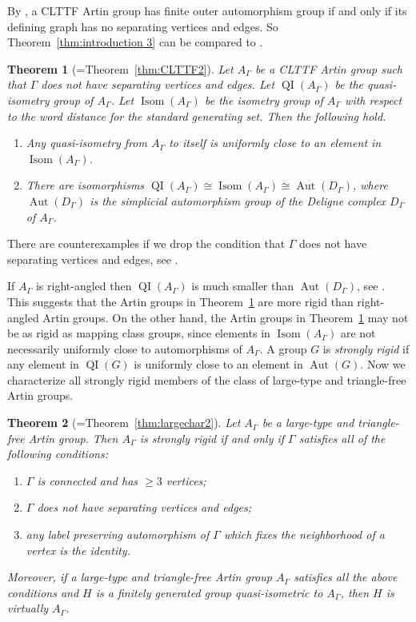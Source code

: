 \documentclass[11pt]{amsart}
\newcommand{\QI}{\operatorname{QI}}
\newcommand{\Isom}{\operatorname{Isom}}
\newcommand{\Aut}{\operatorname{Aut}}
\newtheorem{theorem}{Theorem}[section]
\theoremstyle{definition}
\begin{document}
By \cite[Theorem 1]{MR2174269}, a CLTTF Artin group has finite outer automorphism group if and only if its defining graph has no separating vertices and edges. So Theorem~\ref{thm:introduction 3} can be compared to \cite[Theorem 1.1]{MR3692971}.

\begin{theorem}[=Theorem~\ref{thm:CLTTF2}]
	\label{thm:intro4}
	Let $A_\Gamma$ be a CLTTF Artin group such that $\Gamma$ does not have separating vertices and edges. Let $\QI(A_\Gamma)$ be the quasi-isometry group of $A_\Gamma$. Let $\Isom(A_\Gamma)$ be the isometry group of $A_\Gamma$ with respect to the word distance for the standard generating set. Then the following hold.
	\begin{enumerate}
		\item Any quasi-isometry from $A_\Gamma$ to itself is uniformly close to an element in $\Isom(A_\Gamma)$.
		\item There are isomorphisms $\QI(A_\Gamma)\cong \Isom(A_\Gamma)\cong \Aut(D_\Gamma)$, where $\Aut(D_\Gamma)$ is the simplicial automorphism group of the Deligne complex $D_\Gamma$ of $A_\Gamma$.
	\end{enumerate}
\end{theorem}

There are counterexamples if we drop the condition that $\Gamma$ does not have separating vertices and edges, see \cite[Lemma 42]{MR2174269}.

If $A_\Gamma$ is right-angled then $\QI(A_\Gamma)$ is much smaller than $\Aut(D_\Gamma)$, see \cite[Corollary 4.20]{MR3692971}. This suggests that the Artin groups in Theorem~\ref{thm:intro4} are more rigid than right-angled Artin groups. On the other hand, the Artin groups in Theorem~\ref{thm:intro4} may not be as rigid as mapping class groups, since elements in $\Isom(A_\Gamma)$ are not necessarily uniformly close to automorphisms of $A_\Gamma$. A group $G$ is \emph{strongly rigid} if any element in $\QI(G)$ is uniformly close to an element in $\Aut(G)$. Now we characterize all strongly rigid members of the class of large-type and triangle-free Artin groups.

\begin{theorem}[=Theorem~\ref{thm:largechar2}]
	\label{thm:largechar}
	Let $A_\Gamma$ be a large-type and triangle-free Artin group. Then $A_\Gamma$ is strongly rigid if and only if $\Gamma$ satisfies all of the following conditions:
	\begin{enumerate}
		\item $\Gamma$ is connected and has $\ge 3$ vertices;
		\item $\Gamma$ does not have separating vertices and edges;
		\item any label preserving automorphism of $\Gamma$ which fixes the neighborhood of a vertex is the identity.
	\end{enumerate}
Moreover, if a large-type and triangle-free Artin group $A_\Gamma$ satisfies all the above conditions and $H$ is a finitely generated group quasi-isometric to $A_\Gamma$, then $H$ is virtually $A_\Gamma$.
\end{theorem}
\end{document}
